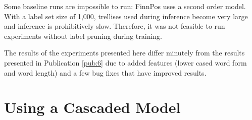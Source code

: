 
Some baseline runs are impossible to run: FinnPos uses a second order
model. With a label set size of 1,000, trellises used during inference
become very large and inference is prohibitively slow. Therefore, it
was not feasible to run experiments without label pruning during
training.

The results of the experiments presented here differ minutely from the
results presented in Publication \ref{pub:6} due to added features
(lower cased word form and word length) and a few bug fixes that have
improved results.

\section{Using a Cascaded Model}


